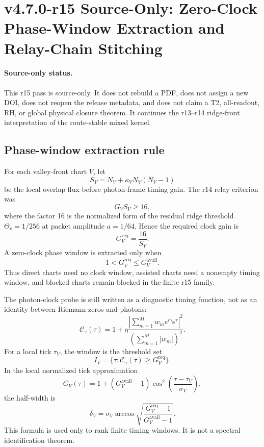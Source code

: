 \section{v4.7.0-r15 Source-Only: Zero-Clock Phase-Window Extraction and Relay-Chain Stitching}
\label{sec:v470-r15-zero-clock-phase-window-relay-stitching}

\paragraph{Source-only status.}
This r15 pass is source-only.  It does not rebuild a PDF, does not assign a new
DOI, does not reopen the release metadata, and does not claim a T2, all-readout,
RH, or global physical closure theorem.  It continues the r13--r14 ridge-front
interpretation of the route-stable mixed kernel.

\subsection{Phase-window extraction rule}
\label{subsec:v470-r15-phase-window-extraction-rule}

For each valley-front chart \(V\), let
\[
S_V=N_V+\kappa_V N_V(N_V-1)
\]
be the local overlap flux before photon-frame timing gain.  The r14 relay
criterion was
\[
G_VS_V\geq16,
\]
where the factor 16 is the normalized form of the residual ridge threshold
\(\Theta_v=1/256\) at packet amplitude \(a=1/64\).  Hence the required clock gain
is
\[
G_V^{\mathrm{req}}=\frac{16}{S_V}.
\]
A zero-clock phase window is extracted only when
\[
1<G_V^{\mathrm{req}}\leq G_V^{\mathrm{avail}}.
\]
Thus direct charts need no clock window, assisted charts need a nonempty timing
window, and blocked charts remain blocked in the finite r15 family.

The photon-clock probe is still written as a diagnostic timing function, not as
an identity between Riemann zeros and photons:
\[
\mathcal C_\gamma(\tau)
=
1+\eta
\frac{\left|\sum_{m=1}^{M}w_m e^{i\gamma_m\tau}\right|^2}
{\left(\sum_{m=1}^{M}|w_m|\right)^2}.
\]
For a local tick \(\tau_V\), the window is the threshold set
\[
I_V=\{\tau:\mathcal C_\gamma(\tau)\geq G_V^{\mathrm{req}}\}.
\]
In the local normalized tick approximation
\[
G_V(\tau)=1+(G_V^{\mathrm{avail}}-1)
\cos^2\!\left(\frac{\tau-\tau_V}{\sigma_V}\right),
\]
the half-width is
\[
\delta_V
=
\sigma_V\arccos\sqrt{\frac{G_V^{\mathrm{req}}-1}{G_V^{\mathrm{avail}}-1}}.
\]
This formula is used only to rank finite timing windows.  It is not a spectral
identification theorem.

